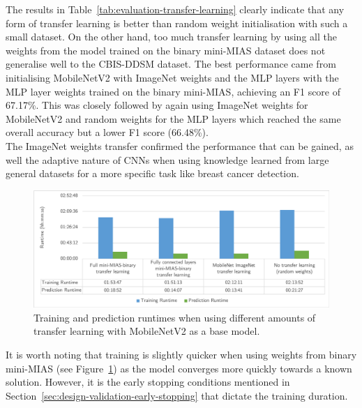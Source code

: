 

The results in Table~\ref{tab:evaluation-transfer-learning} clearly indicate that any form of transfer learning is better than random weight initialisation with such a small dataset. On the other hand, too much transfer learning by using all the weights from the model trained on the binary mini-MIAS dataset does not generalise well to the CBIS-DDSM dataset. The best performance came from initialising MobileNetV2 with ImageNet weights and the MLP layers with the MLP layer weights trained on the binary mini-MIAS, achieving an F1 score of 67.17\%. This was closely followed by again using ImageNet weights for MobileNetV2 and random weights for the MLP layers which reached the same overall accuracy but a lower F1 score (66.48\%).\\

The ImageNet weights transfer confirmed the performance that can be gained, as well the adaptive nature of CNNs when using knowledge learned from large general datasets for a more specific task like breast cancer detection.\\

\begin{figure}[h]
\centerline{\includegraphics[width=\textwidth]{figures/evaluation/transfer_learning_experiment/runtimes.png}}
\caption{\label{fig:evaluation-transfer_learning_experiment-runtimes}Training and prediction runtimes when using different amounts of transfer learning with MobileNetV2 as a base model.}
\end{figure}

It is worth noting that training is slightly quicker when using weights from binary mini-MIAS (see Figure~\ref{fig:evaluation-transfer_learning_experiment-runtimes}) as the model converges more quickly towards a known solution. However, it is the early stopping conditions mentioned in Section~\ref{sec:design-validation-early-stopping} that dictate the training duration.

